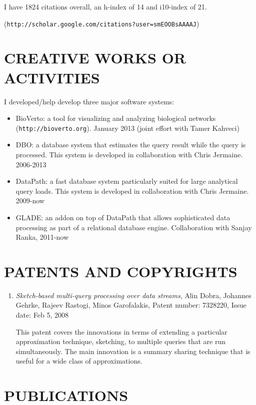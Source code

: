 \documentclass{article}
\begin{document}
I have 1824 citations overall, an h-index of 14 and i10-index of 21. 

(\texttt{http://scholar.google.com/citations?user=smEOOBsAAAAJ})


\section{CREATIVE WORKS OR ACTIVITIES}

I developed/help develop three major software systems:
\begin{itemize}
\item BioVerto: a tool for visualizing and analyzing biological networks 
(\texttt{http://bioverto.org}). January 2013 (joint effort with Tamer Kahveci)
\item DBO: a database system that estimates the query result while the
  query is processed. This system is developed in collaboration with
  Chris Jermaine. 2006-2013
\item DataPath: a fast database system particularly suited for large
  analytical query loads. This system is developed in collaboration with
  Chris Jermaine. 2009-now
\item GLADE: an addon on top of DataPath that allows sophisticated
  data processing as part of a relational database engine. Collaboration with Sanjay Ranka, 2011-now
\end{itemize}

\section{PATENTS AND COPYRIGHTS}

\begin{enumerate}
  \item \emph{Sketch-based multi-query processing over data streams}, 
   Alin Dobra, Johannes Gehrke, Rajeev Rastogi, Minos Garofalakis,
   Patent number: 7328220, Issue date: Feb 5, 2008

   This patent covers the innovations in terms of extending a
   particular approximation technique, sketching, to multiple queries
   that are run simultaneously. The main innovation is a summary 
   sharing technique that is useful for a wide class of approximations.

\end{enumerate}

\section{PUBLICATIONS}
\end{document}
